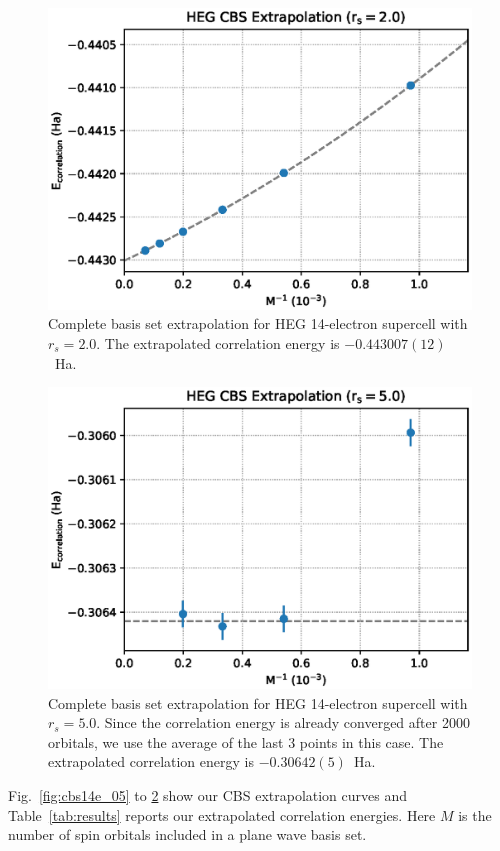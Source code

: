 \begin{figure}
  \begin{center}
  \includegraphics[width=\linewidth]{figs/cbs14e_20.eps}
  \end{center}
  \vspace{-0.2cm}
  \caption{Complete basis set extrapolation for HEG 14-electron supercell with $r_s=2.0$.
  The extrapolated correlation energy is $-0.443007(12)$~Ha.
  }
  \label{fig:cbs14e_20}
\end{figure}
\begin{figure}
  \begin{center}
  \includegraphics[width=\linewidth]{figs/cbs14e_50.eps}
  \end{center}
  \vspace{-0.2cm}
  \caption{Complete basis set extrapolation for HEG 14-electron supercell with $r_s=5.0$.
  Since the correlation energy is already converged after 2000 orbitals, we use the average of the last 3 points in this case.
  The extrapolated correlation energy is $-0.30642(5)$~Ha.
  }
  \label{fig:cbs14e_50}
\end{figure}
Fig.~\ref{fig:cbs14e_05} to \ref{fig:cbs14e_50} show our CBS extrapolation curves and Table~\ref{tab:results} reports our extrapolated correlation energies.
Here $M$ is the number of spin orbitals included in a plane wave basis set.

